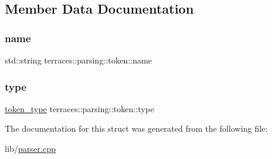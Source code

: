 \subsection{Member Data Documentation}
\mbox{\label{structterraces_1_1parsing_1_1token_a58acae611947cb71644268d10d7f12fb}} 
\subsubsection{\texorpdfstring{name}{name}}
{\footnotesize\ttfamily std\+::string terraces\+::parsing\+::token\+::name}

\mbox{\label{structterraces_1_1parsing_1_1token_a693232d0e7f4657065cd86b289be10fc}} 
\subsubsection{\texorpdfstring{type}{type}}
{\footnotesize\ttfamily \hyperlink{namespaceterraces_1_1parsing_a2d265240dc54342f9462104d7a8392a1}{token\+\_\+type} terraces\+::parsing\+::token\+::type}



The documentation for this struct was generated from the following file\+:\begin{DoxyCompactItemize}
\item 
lib/\hyperlink{lib_2parser_8cpp}{parser.\+cpp}\end{DoxyCompactItemize}
